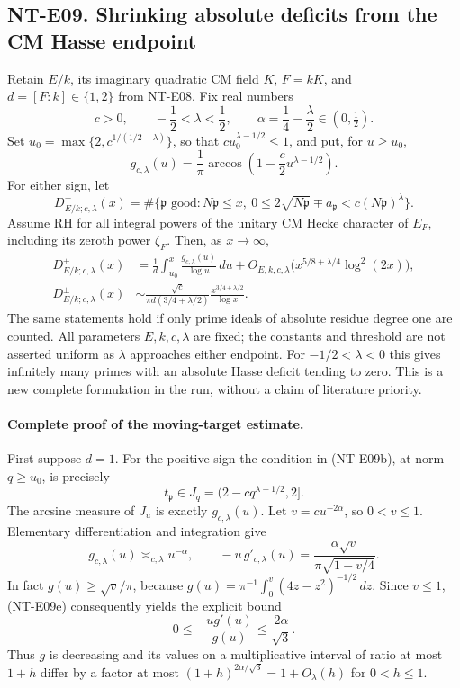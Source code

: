 \subsection*{NT-E09. Shrinking absolute deficits from the CM Hasse endpoint}
Retain $E/k$, its imaginary quadratic CM field $K$, $F=kK$, and
$d=[F:k]\in\{1,2\}$ from NT-E08. Fix real numbers
\[
 c>0,\qquad -\frac12<\lambda<\frac12,\qquad
 \alpha=\frac14-\frac{\lambda}{2}\in(0,\tfrac12).
\]
Set $u_0=\max\{2,c^{1/(1/2-\lambda)}\}$, so that
$c u_0^{\lambda-1/2}\le1$, and put, for $u\ge u_0$,
\[
 g_{c,\lambda}(u)=\frac1\pi
       \arccos\!\left(1-\frac c2u^{\lambda-1/2}\right).
                                                               \tag{NT-E09a}
\]
For either sign, let
\[
 D^\pm_{E/k;c,\lambda}(x)
 =\#\{\mathfrak p\text{ good}:N\mathfrak p\le x,\
              0\le2\sqrt{N\mathfrak p}\mp a_{\mathfrak p}
                           <c(N\mathfrak p)^\lambda\}.
                                                               \tag{NT-E09b}
\]
Assume RH for all integral powers of the unitary CM Hecke character
of $E_F$, including its zeroth power $\zeta_F$. Then, as $x\to\infty$,
\begin{align}
 D^\pm_{E/k;c,\lambda}(x)
   &=\frac1d\int_{u_0}^{x}\frac{g_{c,\lambda}(u)}{\log u}\,du
       +O_{E,k,c,\lambda}
           \bigl(x^{5/8+\lambda/4}\log^2(2x)\bigr),       \tag{NT-E09c}\\
 D^\pm_{E/k;c,\lambda}(x)
   &\sim\frac{\sqrt c}{\pi d(3/4+\lambda/2)}
                     \frac{x^{3/4+\lambda/2}}{\log x}.   \tag{NT-E09d}
\end{align}
The same statements hold if only prime ideals of absolute residue
degree one are counted. All parameters $E,k,c,\lambda$ are fixed;
the constants and threshold are not asserted uniform as
$\lambda$ approaches either endpoint.
For $-1/2<\lambda<0$ this gives infinitely many primes with an
absolute Hasse deficit tending to zero. This is a new complete
formulation in the run, without a claim of literature priority.

\paragraph{Complete proof of the moving-target estimate.}
First suppose $d=1$. For the positive sign the condition in
(NT-E09b), at norm $q\ge u_0$, is precisely
\[
 t_{\mathfrak p}\in
  J_q=(2-cq^{\lambda-1/2},2].
\]
The arcsine measure of $J_u$ is exactly $g_{c,\lambda}(u)$.
Let $v=cu^{-2\alpha}$, so $0<v\le1$. Elementary differentiation
and integration give
\[
 g_{c,\lambda}(u)\asymp_{c,\lambda}u^{-\alpha},
 \qquad
 -u\,g'_{c,\lambda}(u)
       =\frac{\alpha\sqrt v}{\pi\sqrt{1-v/4}}.            \tag{NT-E09e}
\]
In fact $g(u)\ge\sqrt v/\pi$, because
$g(u)=\pi^{-1}\int_0^v(4z-z^2)^{-1/2}\,dz$.
Since $v\le1$, (NT-E09e) consequently yields the explicit bound
\[
 0\le-\frac{u g'(u)}{g(u)}\le\frac{2\alpha}{\sqrt3}.
                                                               \tag{NT-E09f}
\]
Thus $g$ is decreasing and its values on a multiplicative interval
of ratio at most $1+h$ differ by a factor at most
$(1+h)^{2\alpha/\sqrt3}=1+O_\lambda(h)$ for $0<h\le1$.

